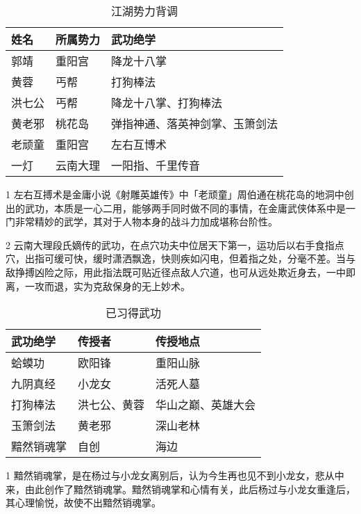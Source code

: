 \documentclass[print, doctor, vlined]{DissertUESTC}
\begin{document}
	\begin{table}[!ht]
		\caption{江湖势力背调} \label{tab: 江湖势力背调}
		\begin{threeparttable}
			\begin{tabular}{p{2cm} p{3cm} p{7cm}}
				\toprule
				\textbf{姓名} & \textbf{所属势力} & \textbf{武功绝学} \\
				\midrule
				郭靖 & 重阳宫 & 降龙十八掌 \\
				黄蓉 & 丐帮 & 打狗棒法 \\
				洪七公 & 丐帮 & 降龙十八掌、打狗棒法 \\
				黄老邪 & 桃花岛 & 弹指神通、落英神剑掌、玉箫剑法 \\
				老顽童 & 重阳宫 & 左右互博术\tnote{1} \\
				一灯 & 云南大理 & 一阳指\tnote{2}、千里传音 \\
				\bottomrule
			\end{tabular}
			\begin{tablenotes}
				\item[1] 左右互搏术是金庸小说《射雕英雄传》中「老顽童」周伯通在桃花岛的地洞中创出的武功，本质是一心二用，能够两手同时做不同的事情，在金庸武侠体系中是一门非常精妙的武学，其对于人物本身的战斗力加成堪称台阶性。
				\item[2] 云南大理段氏嫡传的武功，在点穴功夫中位居天下第一，运功后以右手食指点穴，出指可缓可快，缓时潇洒飘逸，快则疾如闪电，但着指之处，分毫不差。当与敌挣搏凶险之际，用此指法既可贴近径点敌人穴道，也可从远处欺近身去，一中即离，一攻而退，实为克敌保身的无上妙术。
			\end{tablenotes}
		\end{threeparttable}
	\end{table}
	
	\begin{table}[!ht]
		\caption{已习得武功} \label{tab: 已习得武功}
		\begin{threeparttable}
			\begin{tabular}{p{3cm} p{3cm} p{5cm}}
				\toprule
				\textbf{武功绝学} & \textbf{传授者} & \textbf{传授地点} \\
				\midrule
				蛤蟆功 & 欧阳锋 & 重阳山脉 \\
				九阴真经 & 小龙女 & 活死人墓 \\
				打狗棒法 & 洪七公、黄蓉 & 华山之巅、英雄大会 \\
				玉箫剑法 & 黄老邪 & 深山老林 \\
				黯然销魂掌\tnote{1} & 自创 & 海边 \\
				\bottomrule
			\end{tabular}
			\begin{tablenotes}[online]
				\item[1] 黯然销魂掌，是在杨过与小龙女离别后，认为今生再也见不到小龙女，悲从中来，由此创作了黯然销魂掌。黯然销魂掌和心情有关，此后杨过与小龙女重逢后，其心理愉悦，故使不出黯然销魂掌。
			\end{tablenotes}
		\end{threeparttable}
	\end{table}
\end{document}
